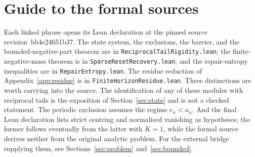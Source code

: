 \documentclass[11pt]{article}
\renewcommand{\commitshort}{bb4e24651b37}
\begin{document}
\appendix
\section{Guide to the formal sources}\label{app:index}

Each linked phrase opens its Lean declaration at the pinned source
revision~\commitshort.  The state system, the exclusions, the barrier, and the
bounded-negative-part theorem are in \texttt{ReciprocalTailRigidity.lean}; the
finite-negative-mass theorem is in \texttt{SparseResetRecovery.lean}; and the
repair-entropy inequalities are in \texttt{RepairEntropy.lean}.  The residue
reduction of Appendix~\ref{app:residue} is in
\texttt{FiniteHorizonResidue.lean}.  Three distinctions are worth carrying into
the source.  The
identification of any of these modules with reciprocal tails is the exposition
of Section~\ref{sec:state} and is not a checked statement.  The periodic exclusion
assumes the regime $e_n<a_n$.  And the final Lean declaration lists strict
centring and normalised vanishing as hypotheses; the former follows eventually
from the latter with $K=1$, while the formal source derives neither from the
original analytic problem.  For the external bridge supplying them,
see Sections~\ref{sec:problem} and~\ref{sec:bounded}.

\iffalse
\end{document}
